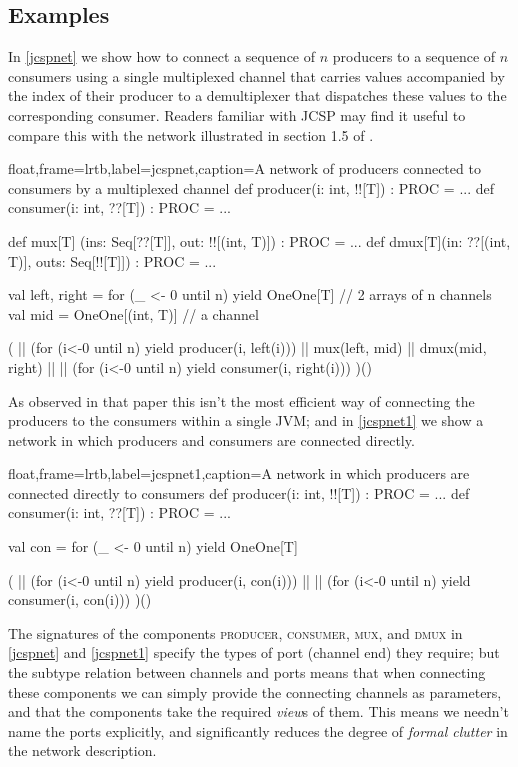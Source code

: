 \documentclass[12pt]{IOS-Book-Article-CPA-2017}
\begin{document}
\subsection{Examples}


In \Listing \ref{jcspnet} we show how to connect a sequence 
of $n$ producers to a sequence of $n$ consumers using a single
multiplexed channel that carries values accompanied by 
the index of their producer to a demultiplexer that dispatches these
values to the corresponding consumer.
Readers familiar with JCSP may find it useful to compare this
with the network illustrated in section 1.5 of \cite{jcsp2}.

\begin{code+}[...]{float,frame=lrtb,label=jcspnet,caption={A network of producers connected to consumers by a multiplexed channel}}
    def producer(i: int, !![T]) : PROC = ...
    def consumer(i: int, ??[T]) : PROC = ...
    
    def mux[T] (ins: Seq[??[T]],   out: !![(int, T)]) : PROC = ...
    def dmux[T](in:  ??[(int, T)], outs: Seq[!![T]])  : PROC = ...
    
    
    val left, right = 
        for (_ <- 0 until n) yield OneOne[T] // 2 arrays of n channels
    val mid = OneOne[(int, T)]               // a channel
    
    (  || (for (i<-0 until n) yield producer(i, left(i)))
    || mux(left, mid)
    || dmux(mid, right)
    || || (for (i<-0 until n) yield consumer(i, right(i)))
    )()  
\end{code+}

As observed in that paper this isn't the most efficient
way of connecting the producers to the consumers within a single
JVM; and in \Listing \ref{jcspnet1} we show a network in which producers
and consumers are connected directly.

\begin{code+}{float,frame=lrtb,label=jcspnet1,caption={A network in which producers are connected directly to consumers}}
    def producer(i: int, !![T]) : PROC = ...
    def consumer(i: int, ??[T]) : PROC = ...
    
    val con = for (_ <- 0 until n) yield OneOne[T]
    
    (  || (for (i<-0 until n) yield producer(i, con(i)))
    || || (for (i<-0 until n) yield consumer(i, con(i)))
    )()  
\end{code+}

The signatures of the components \textsc{producer}, \textsc{consumer},
\textsc{mux}, and \textsc{dmux} in \Listings \ref{jcspnet} and
\ref{jcspnet1} specify the types of port (channel end) they require;
but the subtype relation between channels and ports means that when
connecting these components we can simply provide the connecting
channels as parameters, and that the components take the required
\textit{view}s of them. This means we needn't name the ports
explicitly, and significantly reduces the degree of \textit{formal
clutter} in the network description.
\end{document}
